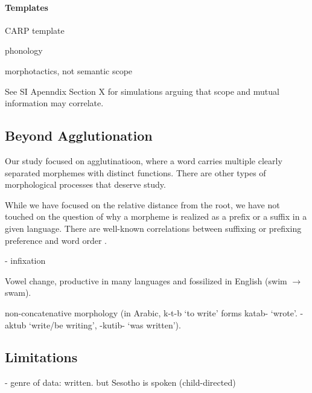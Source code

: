 \documentclass[11pt,letterpaper]{article}
\begin{document}
\paragraph{Templates}
CARP template


\cite{muysken1981quechua}

\cite{mccarthy2008generalized} phonology

\cite{hyman2003suffix}

\cite{kanu2009suffix} morphotactics, not semantic scope



See SI Apenndix Section X for simulations arguing that scope and mutual information may correlate.








\subsection{Beyond Agglutionation}

Our study focused on agglutinatioon, where a word carries multiple clearly separated morphemes with distinct functions.
There are other types of morphological processes that deserve study.

While we have focused on the relative distance from the root, we have not touched on the question of why a morpheme is realized as a prefix or a suffix in a given language.
There are well-known correlations between suffixing or prefixing preference and word order \citep{greenberg1963universals}.

- infixation

Vowel change, productive in many languages and fossilized in English (swim $\rightarrow$ swam).

non-concatenative morphology (in Arabic, k-t-b `to write' forms katab- `wrote'. -aktub `write/be writing', -kutib- `was written').

\subsection{Limitations}

- genre of data: written. but Sesotho is spoken (child-directed)
\end{document}

